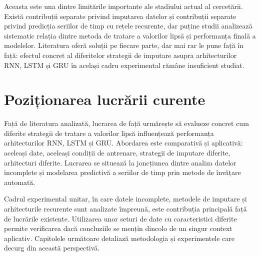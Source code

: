 Aceasta este una dintre limitările importante ale stadiului actual al cercetării. Există contribuții separate privind imputarea datelor și contribuții separate privind predicția seriilor de timp cu rețele recurente, dar puține studii analizează sistematic relația dintre metoda de tratare a valorilor lipsă și performanța finală a modelelor. Literatura oferă soluții pe fiecare parte, dar mai rar le pune față în față: efectul concret al diferitelor strategii de imputare asupra arhitecturilor RNN, LSTM și GRU în același cadru experimental rămâne insuficient studiat.

\section{Poziționarea lucrării curente}

Față de literatura analizată, lucrarea de față urmărește să evalueze concret cum diferite strategii de tratare a valorilor lipsă influențează performanța arhitecturilor RNN, LSTM și GRU. Abordarea este comparativă și aplicativă: aceleași date, aceleași condiții de antrenare, strategii de imputare diferite, arhitecturi diferite. Lucrarea se situează la joncțiunea dintre analiza datelor incomplete și modelarea predictivă a seriilor de timp prin metode de învățare automată.

Cadrul experimental unitar, în care datele incomplete, metodele de imputare și arhitecturile recurente sunt analizate împreună, este contribuția principală față de lucrările existente. Utilizarea unor seturi de date cu caracteristici diferite permite verificarea dacă concluziile se mențin dincolo de un singur context aplicativ. Capitolele următoare detaliază metodologia și experimentele care decurg din această perspectivă.
